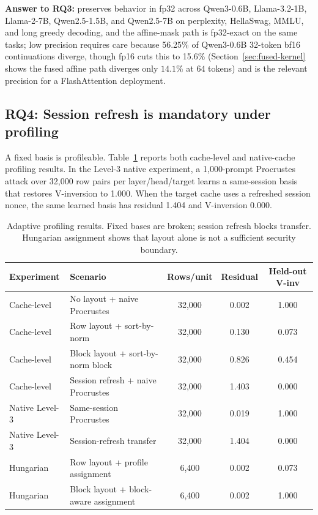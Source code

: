 \textbf{Answer to RQ3:} \sys{} preserves behavior in fp32 across Qwen3-0.6B, Llama-3.2-1B, Llama-2-7B, Qwen2.5-1.5B, and Qwen2.5-7B on perplexity, HellaSwag, MMLU, and long greedy decoding, and the affine-mask path is fp32-exact on the same tasks; low precision requires care because 56.25\% of Qwen3-0.6B 32-token bf16 continuations diverge, though fp16 cuts this to 15.6\% (Section~\ref{sec:fused-kernel} shows the fused affine path diverges only $14.1\%$ at $64$ tokens) and is the relevant precision for a FlashAttention deployment.

\subsection{RQ4: Session refresh is mandatory under profiling}

A fixed basis is profileable. Table~\ref{tab:profiling} reports both cache-level and native-cache profiling results. In the Level-3 native experiment, a 1,000-prompt Procrustes attack over 32,000 row pairs per layer/head/target learns a same-session basis that restores V-inversion to 1.000. When the target cache uses a refreshed session nonce, the same learned basis has residual 1.404 and V-inversion 0.000.

\begin{table}[t]
\centering
\caption{Adaptive profiling results. Fixed bases are broken; session refresh blocks transfer. Hungarian assignment shows that layout alone is not a sufficient security boundary.}
\label{tab:profiling}
\begin{tabular}{llccc}
\toprule
Experiment & Scenario & Rows/unit & Residual & Held-out V-inv \\
\midrule
Cache-level & No layout + naive Procrustes & 32,000 & 0.002 & 1.000 \\
Cache-level & Row layout + sort-by-norm & 32,000 & 0.130 & 0.073 \\
Cache-level & Block layout + sort-by-norm block & 32,000 & 0.826 & 0.454 \\
Cache-level & Session refresh + naive Procrustes & 32,000 & 1.403 & 0.000 \\
Native Level-3 & Same-session Procrustes & 32,000 & 0.019 & 1.000 \\
Native Level-3 & Session-refresh transfer & 32,000 & 1.404 & 0.000 \\
Hungarian & Row layout + profile assignment & 6,400 & 0.002 & 0.073 \\
Hungarian & Block layout + block-aware assignment & 6,400 & 0.002 & 1.000 \\
\bottomrule
\end{tabular}
\end{table}

